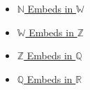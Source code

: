 \begin{dependencies}
\begin{itemize}
  \item \hyperref[thm:n-embeds-in-w]{$\mathbb{N}$ Embeds in $\mathbb{W}$}
  \item \hyperref[thm:w-embeds-in-z]{$\mathbb{W}$ Embeds in $\mathbb{Z}$}
  \item \hyperref[thm:z-embeds-in-q]{$\mathbb{Z}$ Embeds in $\mathbb{Q}$}
  \item \hyperref[thm:q-embeds-in-r]{$\mathbb{Q}$ Embeds in $\mathbb{R}$}
\end{itemize}
\end{dependencies}
